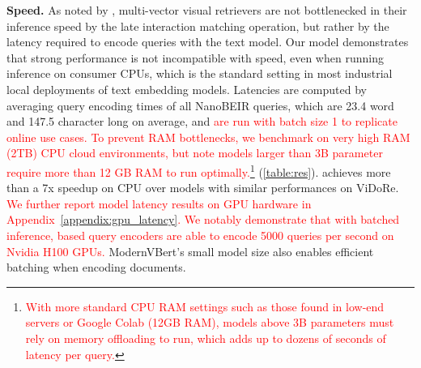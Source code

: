 \noindent\textbf{Speed.} As noted by \citet{xiao2025metaembedscalingmultimodalretrieval}, multi-vector visual retrievers are not bottlenecked in their inference speed by the late interaction matching operation, but rather by the latency required to encode queries with the text model. Our model demonstrates that strong performance is not incompatible with speed, even when running inference on consumer CPUs, which is the standard setting in most industrial local deployments of text embedding models. Latencies are computed by averaging query encoding times of all NanoBEIR queries, which are 23.4 word and 147.5 character long on average, and \textcolor{red}{are run with batch size 1 to replicate online use cases. To prevent RAM bottlenecks, we benchmark on very high RAM (2TB) CPU cloud environments, but note models larger than 3B parameter require more than 12 GB RAM to run optimally.}\footnote{\textcolor{red}{With more standard CPU RAM settings such as those found in low-end servers or Google Colab (12GB RAM), models above 3B parameters must rely on memory offloading to run, which adds up to dozens of seconds of latency per query.}}  (\autoref{table:res}). \flagship{} achieves more than a 7x speedup on CPU over models with similar performances on ViDoRe. \textcolor{red}{We further report model latency results on GPU hardware in Appendix~\ref{appendix:gpu_latency}. We notably demonstrate that with batched inference, \flagship{} based query encoders are able to encode 5000 queries per second on Nvidia H100 GPUs.} ModernVBert's small model size also enables efficient batching when encoding documents. 




